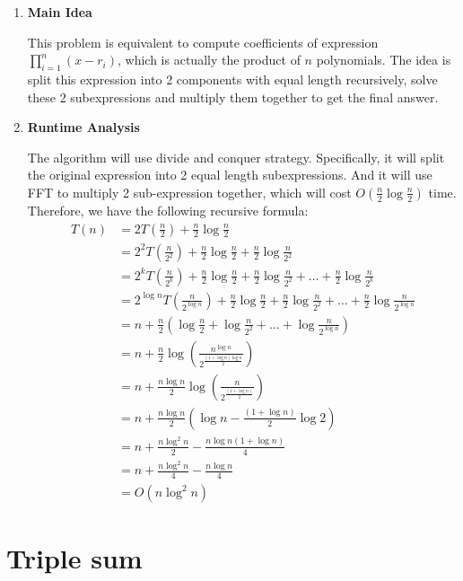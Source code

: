 \documentclass[11pt]{article}
\newenvironment{qparts}{\begin{enumerate}[{(}a{)}]}{\end{enumerate}}
\begin{document}
\begin{qparts}
	\item \textbf{Main Idea}
	
	This problem is equivalent to compute coefficients of expression $\prod_{i=1}^{n}(x - r_i)$, which is actually the product of $n$ polynomials. The idea is split this expression into 2 components with equal length recursively, solve these 2 subexpressions and multiply them together to get the final answer. 
	
	\item \textbf{Runtime Analysis}
	
	The algorithm will use divide and conquer strategy. Specifically, it will split the original expression into 2 equal length subexpressions.  And it will use FFT to multiply 2 sub-expression together, which will cost $O( \frac{n}{2}\log \frac{n}{2})$ time. Therefore, we have the following recursive formula:
	\begin{align*}
		T(n) &= 2T(\frac{n}{2}) + \frac{n}{2}\log \frac{n}{2} \\
		&= 2^2T(\frac{n}{2^2}) + \frac{n}{2}\log \frac{n}{2} + \frac{n}{2}\log \frac{n}{2^2} \\
		&= 2^kT(\frac{n}{2^k}) + \frac{n}{2}\log \frac{n}{2} + \frac{n}{2}\log \frac{n}{2^2} + \ldots + \frac{n}{2}\log \frac{n}{2^k} \\
		&= 2^{\log n}T(\frac{n}{2^{\log n}}) + \frac{n}{2}\log \frac{n}{2} + \frac{n}{2}\log \frac{n}{2^2} + \ldots + \frac{n}{2}\log \frac{n}{2^{\log n}} \\
		&= n + \frac{n}{2}(\log \frac{n}{2} + \log \frac{n}{2^2} + \ldots + \log \frac{n}{2^{\log n}}) \\
		&= n + \frac{n}{2} \log ({\frac{n^{\log n}}{2^{\frac{(1 + \log n)\log n}{2}}}}) \\
		&= n + \frac{n\log n}{2} \log ({\frac{n}{2^{\frac{(1 + \log n)}{2}}}}) \\
		&= n + \frac{n\log n}{2} (\log n - \frac{(1 + \log n)}{2} \log 2) \\
		&= n + \frac{n\log^2 n}{2} - \frac{ n\log n (1 + \log n)}{4}  \\
		&= n + \frac{n\log^2 n}{4} - \frac{ n\log n }{4}  \\
		&= O(n \log^2 n)
	\end{align*}
\end{qparts}
	
\newpage
\section{Triple sum}
\end{document}
